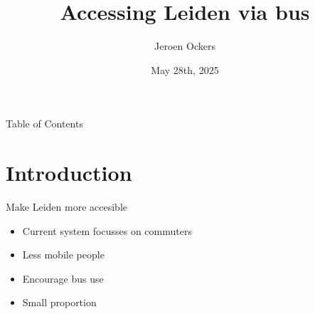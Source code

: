 \documentclass[9pt, aspectratio=43, english]{beamer}
\title{Accessing Leiden via bus}
\subtitle{}
\author{Jeroen Ockers}
\institute{Universiteit Leiden}
\date{May 28th, 2025}
\begin{document}


\begin{frame}[plain]
  \maketitle
\end{frame}
\addtocounter{framenumber}{-1}%


\begin{frame}{Table of Contents}
  \tableofcontents[sectionstyle=show/show, hideallsubsections]
\end{frame}


\section{Introduction}
\begin{frame}{Make Leiden more accesible}
  \begin{itemize}
    \item <1->Current system focusses on commuters
    \item <2->Less mobile people
    \item <3->Encourage bus use
    \item <4->Small proportion
  \end{itemize}
\end{frame}
\end{document}
